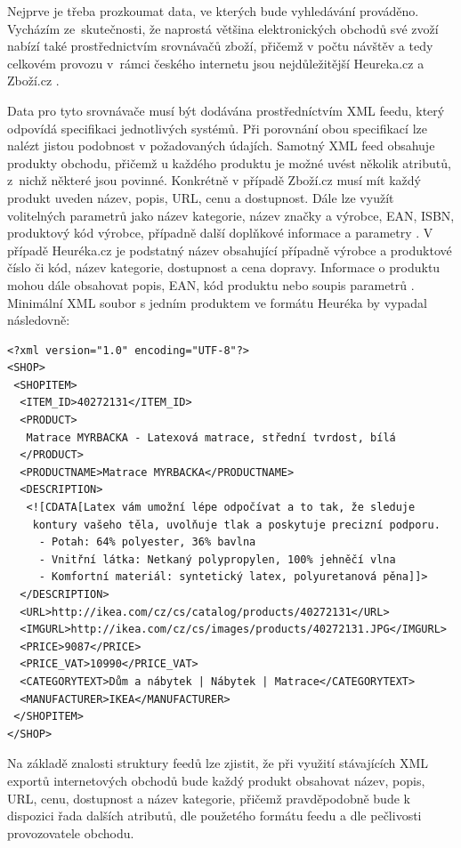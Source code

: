 \documentclass[FM,DP]{tulthesis}
\begin{document}
Nejprve je třeba prozkoumat data, ve kterých bude vyhledávání prováděno. Vycházím
ze~skutečnosti, že naprostá většina elektronických obchodů své zvoží nabízí také 
prostřednictvím srovnávačů zboží, přičemž v počtu návštěv a tedy celkovém provozu 
v~rámci českého internetu jsou nejdůležitější Heureka.cz a Zboží.cz \cite{netmonitor}. 

Data pro tyto srovnávače musí být dodávána prostředníctvím XML feedu, který odpovídá 
specifikaci jednotlivých systémů. Při porovnání obou specifikací lze nalézt 
jistou podobnost v požadovaných údajích. Samotný XML feed obsahuje
produkty obchodu, přičemž u každého produktu je možné uvést několik atributů, z~nichž
některé jsou povinné. Konkrétně v případě Zboží.cz musí mít každý produkt uveden název, 
popis, URL, cenu a dostupnost. Dále lze využít volitelných parametrů jako název kategorie, 
název značky a výrobce, EAN, ISBN, produktový kód výrobce, případně další doplňkové
informace a parametry \cite{xml-zbozi}. V případě Heuréka.cz je podstatný název
obsahující případně výrobce a produktové číslo či kód, název kategorie, dostupnost a
cena dopravy. Informace o produktu mohou dále obsahovat popis, EAN, kód produktu
nebo soupis parametrů \cite{xml-heureka}. Minimální XML soubor s jedním produktem 
ve formátu Heuréka by vypadal následovně:

\begin{verbatim}
<?xml version="1.0" encoding="UTF-8"?>
<SHOP>
 <SHOPITEM>
  <ITEM_ID>40272131</ITEM_ID>
  <PRODUCT>
   Matrace MYRBACKA - Latexová matrace, střední tvrdost, bílá
  </PRODUCT>
  <PRODUCTNAME>Matrace MYRBACKA</PRODUCTNAME>
  <DESCRIPTION>
   <![CDATA[Latex vám umožní lépe odpočívat a to tak, že sleduje
    kontury vašeho těla, uvolňuje tlak a poskytuje precizní podporu.
     - Potah: 64% polyester, 36% bavlna
     - Vnitřní látka: Netkaný polypropylen, 100% jehněčí vlna
     - Komfortní materiál: syntetický latex, polyuretanová pěna]]>
  </DESCRIPTION>
  <URL>http://ikea.com/cz/cs/catalog/products/40272131</URL>
  <IMGURL>http://ikea.com/cz/cs/images/products/40272131.JPG</IMGURL>
  <PRICE>9087</PRICE>
  <PRICE_VAT>10990</PRICE_VAT>
  <CATEGORYTEXT>Dům a nábytek | Nábytek | Matrace</CATEGORYTEXT>
  <MANUFACTURER>IKEA</MANUFACTURER>
 </SHOPITEM>
</SHOP>
\end{verbatim}

Na základě znalosti struktury feedů lze zjistit, že při využití stávajících XML exportů
internetových obchodů bude každý produkt obsahovat název, popis, URL, cenu, dostupnost
a název kategorie, přičemž pravděpodobně bude k dispozici řada dalších atributů, 
dle použetého formátu feedu a dle pečlivosti provozovatele obchodu.
\end{document}
